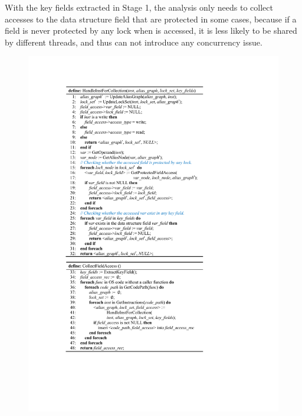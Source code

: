 With the key fields extracted in Stage 1, the 
analysis only needs to collect accesses to the data structure field that are 
protected in some cases, because if a field is never protected by any lock when 
is accessed, it is less likely to be shared by different threads, and thus can 
not introduce any concurrency issue.

\begin{figure}[htbp]
	\centering
	\includegraphics[width=1\linewidth]{figures/fig_pseudocode_access_collect.pdf}
	\label{fig_pseudocode_access_collect}
\end{figure}

